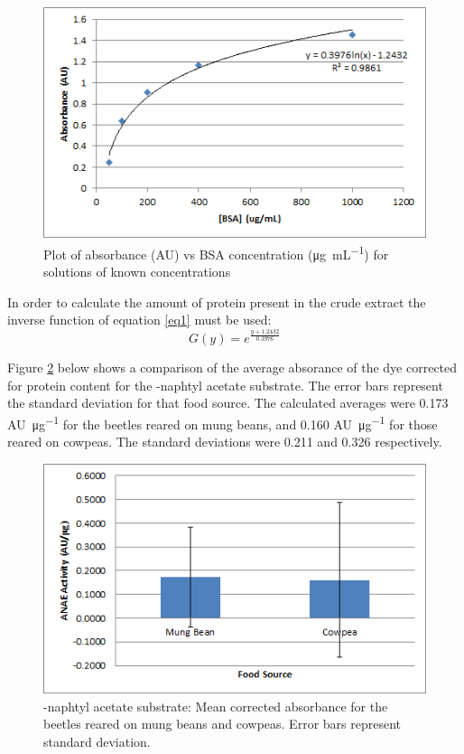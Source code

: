 \documentclass[12pt]{article}
\begin{document}
	\begin{figure}[h]
		\centering
		\includegraphics{stdcurve.png}
		\caption{Plot of absorbance (\si{AU}) vs BSA concentration (\si{\micro\gram\per\milli\liter}) for solutions of known concentrations}
		\label{stdcurve}
	\end{figure}
	In order to calculate the amount of protein present in the crude extract the inverse function of equation \ref{eq1} must be used:
	\begin{equation}\label{eq2}
		G(y)=e^{\frac{y+1.2432}{0.3976}}
	\end{equation}
	
	Figure \ref{anae} below shows a comparison of the average absorance of the dye corrected for protein content for the \textalpha-naphtyl acetate substrate. The error bars represent the standard deviation for that food source. The calculated averages were 0.173 \si{AU\per\micro\gram} for the beetles reared on mung beans, and 0.160 \si{AU\per\micro\gram} for those reared on cowpeas. The standard deviations were 0.211 and 0.326 respectively.
	\begin{figure}[h]
		\centering
		\includegraphics{ANAE.png}
		\caption{\textalpha-naphtyl acetate substrate: Mean corrected absorbance for the beetles reared on mung beans and cowpeas. Error bars represent standard deviation.}
		\label{anae}
	\end{figure}
	
\end{document}
